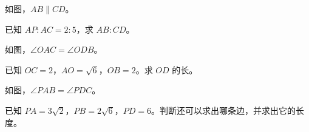 \documentclass{exam-zh}
\begin{document}

\begin{problem}[points=10]
  \noindent
  \begin{minipage}[t]{\dimexpr\linewidth-60mm-6mm\relax}
    \vspace{0pt}
    如图，$AB\parallel CD$。

已知 $AP:AC=2:5$，求 $AB:CD$。
    
  \end{minipage}\hfill
  \begin{diagramcoltikz}{60mm}{}
  }
  \end{diagramcoltikz}
  \par\medskip
  \answerarea[48mm]
\end{problem}



\begin{problem}[points=10]
  \noindent
  \begin{minipage}[t]{\dimexpr\linewidth-60mm-6mm\relax}
    \vspace{0pt}
    如图，$\angle OAC=\angle ODB$。

已知 $OC=2$，$AO=\sqrt{6}$，$OB=2$。求 $OD$ 的长。
    
  \end{minipage}\hfill
  \begin{diagramcoltikz}{60mm}{}
  }
  \end{diagramcoltikz}
  \par\medskip
  \answerarea[54mm]
\end{problem}



\begin{problem}[points=10]
  \noindent
  \begin{minipage}[t]{\dimexpr\linewidth-60mm-6mm\relax}
    \vspace{0pt}
    如图，$\angle PAB=\angle PDC$。

已知 $PA=3\sqrt{2}$，$PB=2\sqrt{6}$，$PD=6$。判断还可以求出哪条边，并求出它的长度。
    
  \end{minipage}\hfill
  \begin{diagramcoltikz}{60mm}{}
  }
  \end{diagramcoltikz}
  \par\medskip
  \answerarea[54mm]
\end{problem}
\end{document}
